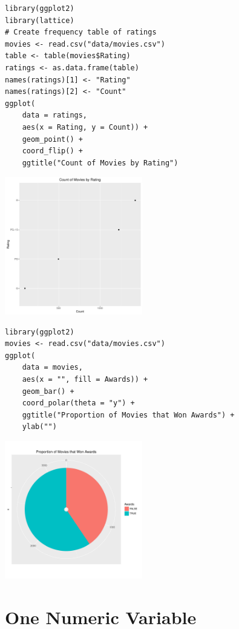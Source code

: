 \documentclass[a4paper, captions=tableheading]{tufte-book}
\begin{document}
\begin{verbatim}
library(ggplot2)
library(lattice)
# Create frequency table of ratings
movies <- read.csv("data/movies.csv")
table <- table(movies$Rating)
ratings <- as.data.frame(table)
names(ratings)[1] <- "Rating"
names(ratings)[2] <- "Count"
ggplot(
	data = ratings,
	aes(x = Rating, y = Count)) +
	geom_point() +
	coord_flip() +
	ggtitle("Count of Movies by Rating")
\end{verbatim}

\includegraphics[height=6cm]{img/1-cat-ggplot2-02.pdf}

\begin{verbatim}
library(ggplot2)
movies <- read.csv("data/movies.csv")
ggplot(
	data = movies,
	aes(x = "", fill = Awards)) +
	geom_bar() +
	coord_polar(theta = "y") +
	ggtitle("Proportion of Movies that Won Awards") +
	ylab("")
\end{verbatim}

\includegraphics[height=6cm]{img/1-cat-ggplot2-03.pdf}


\section{One Numeric Variable}
\label{sec:orgheadline10}
\end{document}

